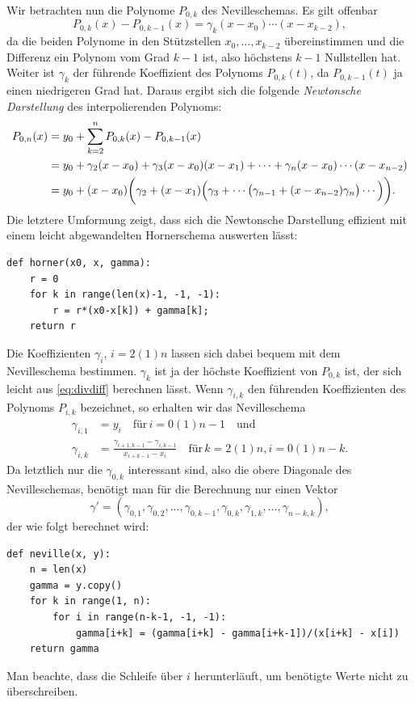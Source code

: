 Wir betrachten nun die Polynome $P_{0,k}$ des Nevilleschemas. Es gilt
offenbar
\begin{equation}
  P_{0,k}(x) - P_{0,k-1}(x) = \gamma_k(x-x_0)\cdots(x-x_{k-2}),
\end{equation}
da die beiden Polynome in den Stützstellen $x_0,\ldots,x_{k-2}$
übereinstimmen und die Differenz ein Polynom vom Grad $k-1$ ist, also
höchstens $k-1$ Nullstellen hat. Weiter ist $\gamma_k$ der führende
Koeffizient des Polynoms $P_{0,k}(t)$, da $P_{0,k-1}(t)$ ja einen
niedrigeren Grad hat. Daraus ergibt sich die folgende \emph{Newtonsche
  Darstellung} des interpolierenden Polynoms:
\begin{equation}
  \begin{split}
    P_{0,n}(x) &= y_0 + \sum_{k=2}^{n} P_{0,k}(x) - P_{0,k-1}(x)\\
    &= y_0 + \gamma_2(x-x_0) + \gamma_3(x-x_0)(x-x_1) + \cdots
    + \gamma_n(x-x_0)\cdots(x-x_{n-2})\\
    &= y_0 + (x-x_0)\biggl(\gamma_2 + (x-x_1)\Bigl(\gamma_3 + \cdots
    \bigl(\gamma_{n-1} + (x-x_{n-2})\gamma_n\bigr)\cdots\Bigr)\biggr).
  \end{split}
\end{equation}
Die letztere Umformung zeigt, dass sich die Newtonsche Darstellung
effizient mit einem leicht abgewandelten Hornerschema auswerten lässt:
\begin{lstlisting}
def horner(x0, x, gamma):
    r = 0
    for k in range(len(x)-1, -1, -1):
        r = r*(x0-x[k]) + gamma[k];
    return r
\end{lstlisting}

Die Koeffizienten $\gamma_i$, $i=2(1)n$ lassen sich dabei bequem mit
dem Nevilleschema bestimmen. $\gamma_k$ ist ja der höchste Koeffizient
von $P_{0,k}$ ist, der sich leicht aus \eqref{eq:divdiff} berechnen
lässt. Wenn $\gamma_{i,k}$ den führenden Koeffizienten des Polynoms
$P_{i,k}$ bezeichnet, so erhalten wir das Nevilleschema
\begin{align}
  \gamma_{i,1} &= y_i \quad\text{für}\, i=0(1)n-1\quad\text{und}\\
  \gamma_{i,k}&= \frac{\gamma_{i+1,k-1} - \gamma_{i,k-1}}{x_{i+k-1} -
    x_i}
  \quad\text{für}\, k=2(1)n, i=0(1)n-k.
\end{align}
Da letztlich nur die $\gamma_{0,k}$ interessant sind, also die obere
Diagonale des Nevilleschemas, benötigt man für die Berechnung nur
einen Vektor
\begin{equation}
  \gamma' = \left(\gamma_{0,1},\gamma_{0,2},\ldots,\gamma_{0,k-1},
    \gamma_{0,k},\gamma_{1,k},\ldots,\gamma_{n-k,k}\right),
\end{equation}
der wie folgt berechnet wird:
\begin{lstlisting}
def neville(x, y):
    n = len(x)
    gamma = y.copy()
    for k in range(1, n):
        for i in range(n-k-1, -1, -1):
            gamma[i+k] = (gamma[i+k] - gamma[i+k-1])/(x[i+k] - x[i])
    return gamma
\end{lstlisting}
Man beachte, dass die Schleife über $i$ herunterläuft, um benötigte
Werte nicht zu überschreiben.

